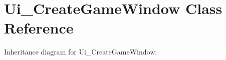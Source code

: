 \hypertarget{classUi__CreateGameWindow}{}\section{Ui\+\_\+\+Create\+Game\+Window Class Reference}
\label{classUi__CreateGameWindow}


Inheritance diagram for Ui\+\_\+\+Create\+Game\+Window\+:

